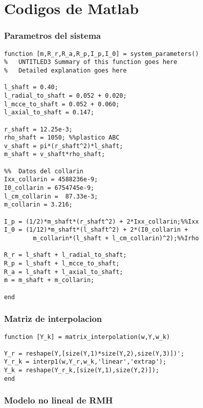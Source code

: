 \chapter{Codigos de Matlab}

\subsection{Parametros del sistema}

\begin{lstlisting}[frame=single]
function [m,R_r,R_a,R_p,I_p,I_0] = system_parameters()
%	UNTITLED3 Summary of this function goes here
%   Detailed explanation goes here

l_shaft = 0.40;
l_radial_to_shaft = 0.052 + 0.020;
l_mcce_to_shaft = 0.052 + 0.060;
l_axial_to_shaft = 0.147;

r_shaft = 12.25e-3;
rho_shaft = 1050; %%plastico ABC
v_shaft = pi*(r_shaft^2)*l_shaft;
m_shaft = v_shaft*rho_shaft;

%%	Datos del collarin
Ixx_collarin = 4588236e-9;
I0_collarin = 6754745e-9;
l_cm_collarin =  87.33e-3;
m_collarin = 3.216;

I_p = (1/2)*m_shaft*(r_shaft^2) + 2*Ixx_collarin;%%Ixx
I_0 = (1/12)*m_shaft*(l_shaft^2) + 2*(I0_collarin + 
		m_collarin*(l_shaft + l_cm_collarin)^2);%%Irho

R_r = l_shaft + l_radial_to_shaft;
R_p = l_shaft + l_mcce_to_shaft;
R_a = l_shaft + l_axial_to_shaft;
m = m_shaft + m_collarin;

end
\end{lstlisting}

\subsection{Matriz de interpolacion}

\begin{lstlisting}[frame=single]
function [Y_k] = matrix_interpolation(w,Y,w_k)

Y_r = reshape(Y,[size(Y,1)*size(Y,2),size(Y,3)])';
Y_r_k = interp1(w,Y_r,w_k,'linear','extrap');
Y_k = reshape(Y_r_k,[size(Y,1),size(Y,2)]);
end
\end{lstlisting}

\subsection{Modelo no lineal de RMH}

